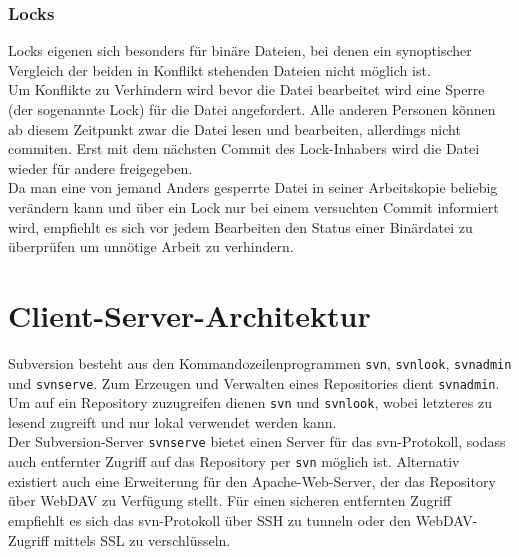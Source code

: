 \subsubsection{Locks}
Locks eigenen sich besonders für binäre Dateien, bei denen ein synoptischer Vergleich der beiden in Konflikt stehenden Dateien nicht möglich ist.\\
Um Konflikte zu Verhindern wird bevor die Datei bearbeitet wird eine Sperre (der sogenannte Lock) für die Datei angefordert. Alle anderen Personen können ab diesem Zeitpunkt zwar die Datei lesen und bearbeiten, allerdings nicht commiten. Erst mit dem nächsten Commit des Lock-Inhabers wird die Datei wieder für andere freigegeben.\\
Da man eine von jemand Anders gesperrte Datei in seiner Arbeitskopie beliebig verändern kann und über ein Lock nur bei einem versuchten Commit informiert wird, empfiehlt es sich vor jedem Bearbeiten den Status einer Binärdatei zu überprüfen um unnötige Arbeit zu verhindern.

\section{Client-Server-Architektur}
Subversion besteht aus den Kommandozeilenprogrammen \texttt{svn}, \texttt{svnlook}, \texttt{svnadmin} und \texttt{svnserve}. Zum Erzeugen und Verwalten eines Repositories dient \texttt{svnadmin}. Um auf ein Repository zuzugreifen dienen \texttt{svn} und \texttt{svnlook}, wobei letzteres zu lesend zugreift und nur lokal verwendet werden kann.\\
Der Subversion-Server \texttt{svnserve} bietet einen Server für das svn-Protokoll, sodass auch entfernter Zugriff auf das Repository per \texttt{svn} möglich ist. Alternativ existiert auch eine Erweiterung für den Apache-Web-Server, der das Repository über WebDAV zu Verfügung stellt. Für einen sicheren entfernten Zugriff empfiehlt es sich das svn-Protokoll über SSH zu tunneln oder den WebDAV-Zugriff mittels SSL zu verschlüsseln.
